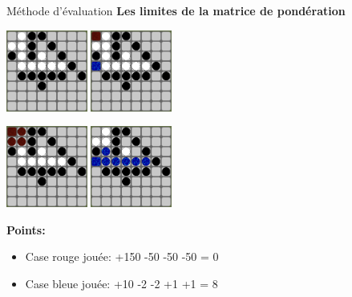 \begin{frame}[t]{Méthode d'évaluation}
    \textbf{Les limites de la matrice de pondération}
    \begin{center}
        \includegraphics[width=0.2\textwidth]{img/matrix_0.png}
        \hspace{0.2\textwidth}
        \includegraphics[width=0.2\textwidth]{img/matrix_1.png}
    \end{center}
    \begin{center}
        \includegraphics[width=0.2\textwidth]{img/matrix_2.png}
        \hspace{0.2\textwidth}
        \includegraphics[width=0.2\textwidth]{img/matrix_3.png}
    \end{center}
    \textbf{Points:}
    \begin{itemize}
        \item Case rouge jouée: +150 -50 -50 -50 = 0
        \item Case bleue jouée: +10 -2 -2 +1 +1 = 8
    \end{itemize}
\end{frame}

